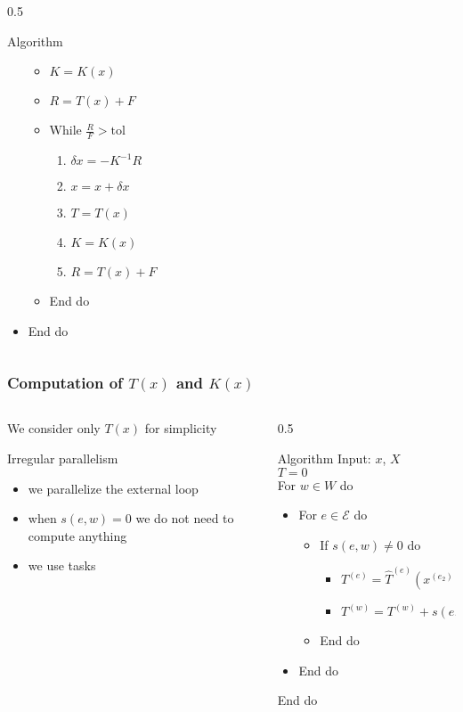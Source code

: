 \documentclass[10pt]{beamer}
\theoremstyle{definition}
\newcommand{\tol}{\text{tol}}
\begin{document}
\begin{frame}
\begin{columns}
\begin{column}{0.5\framewidth}
\begin{block}{Algorithm}
\begin{itemize}
\begin{itemize}
\item $K=K(x)$
\item $R=T(x)+F$
\item While $\frac{R}{F}>\tol$
\begin{enumerate}
\item $\delta x=-K^{-1}R$
\item $x=x+\delta x$
\item $T=T(x)$
\item $K=K(x)$
\item $R=T(x)+F$
\end{enumerate}
\item End do
\end{itemize}
\item End do
\end{itemize}
\end{block}
\end{column}
\end{columns}

\end{frame}

\begin{frame}
\frametitle{Computation of $T(x)$ and $K(x)$}

\begin{columns}
\begin{column}{0.35\textwidth}
We consider only $T(x)$ for simplicity
\begin{block}{Irregular parallelism}
\begin{itemize}
\item we parallelize the external loop
\item when $s(e,w)=0$ we do not need to compute anything
\item we use tasks
\end{itemize}
\end{block}
\end{column}
\begin{column}{0.5\framewidth}
\begin{block}{Algorithm}
Input: $x$, $X$ \\
$T=0$ \\
For $w\in W$ do\\
\begin{itemize}
\item[] For $e\in\mathcal{E}$ do
\begin{itemize}
\item[] If $s(e,w)\neq 0$ do
\begin{itemize}
\item[] $T^{(e)}=\hat{T}^{(e)}(x^{(e_2)}-x^{(e_1)})$
\item[] $T^{(w)}=T^{(w)}+s(e,w)$
\end{itemize}
\item[] End do
\end{itemize}
\item[] End do
\end{itemize}
End do
\end{block}
\end{column}
\end{columns}

\end{frame}
\end{document}

